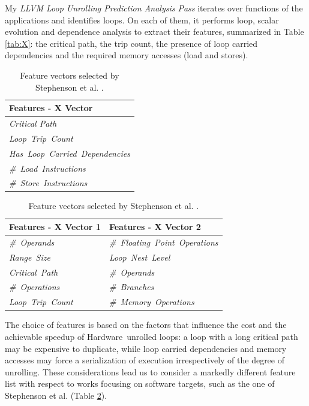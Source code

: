 \documentclass[]{usiinfthesis}
\newcommand{\HW}{{Hardware}}
\begin{document}
My \textit{LLVM Loop Unrolling Prediction Analysis Pass} iterates over functions
of the applications and identifies loops. On each of them, it performs
loop, scalar evolution and dependence analysis to extract their
features, summarized in Table \ref{tab:X}: the critical path, the trip
count, the presence of loop carried dependencies and the required
memory accesses (load and stores).\par

%
%
\begin{table}[h]
  \centering

  \small\addtolength{\tabcolsep}{-3pt}
  \vspace{1em}
  \begin{tabular}{| l |} 
 \hline    
 \textbf{Features - X Vector}  \\ \hline
    \emph{Critical Path}      \\ \hline
   \emph{ Loop\ Trip\ Count} \\ \hline
   \emph{ Has\ Loop\ Carried\ Dependencies}     \\ \hline
   \emph{ \#\ Load\ Instructions}     \\ \hline
   \emph{ \#\ Store\ Instructions}      \\ \hline
  \end{tabular} 
    \caption{Features extracted by LLVM LU Analysis Pass.}
      \label{tab:X}
  
  
     \vspace{2em}
  

  \begin{tabular}{| l | l |} 
 \hline    
 \textbf{Features - X Vector 1} & \textbf{Features - X Vector 2}  \\ \hline
  \emph{\#\ Operands}        &\emph{\#\ Floating\ Point\ Operations}        \\ \hline
  \emph{Range\ Size}     &\emph{Loop\ Nest\ Level}   \\ \hline
    \emph{Critical\ Path}   &\emph{\#\ Operands}  \\ \hline
  \emph{\#\ Operations}      &\emph{\#\ Branches}   \\ \hline
  \emph{Loop\ Trip\ Count}&\emph{\#\ Memory\ Operations}   \\ \hline
  \end{tabular}
    \caption{Feature vectors selected by Stephenson et al. \cite{StephensonApr05}.}
      \label{tab:St_X1_X2}
\end{table}

The choice of features is based on the factors that influence the cost
and the achievable speedup of \HW\ unrolled loops: a loop with a
long critical path may be expensive to duplicate, while loop carried
dependencies and memory accesses may force a serialization of
execution irrespectively of the degree of unrolling. These
considerations lead us to consider a markedly different feature list
with respect to works focusing on software targets, such as the one of
Stephenson et al. (Table \ref{tab:St_X1_X2}).\par
\end{document}
